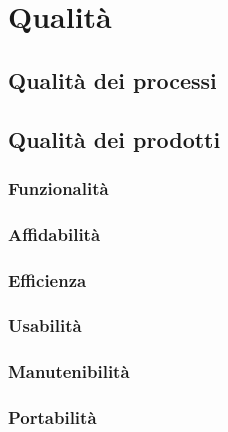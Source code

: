 \section{Qualità}

	\subsection{Qualità dei processi}
	\subsection{Qualità dei prodotti}
		\subsubsection{Funzionalità}
		\subsubsection{Affidabilità}
		\subsubsection{Efficienza}
		\subsubsection{Usabilità}
		\subsubsection{Manutenibilità}
		\subsubsection{Portabilità}

